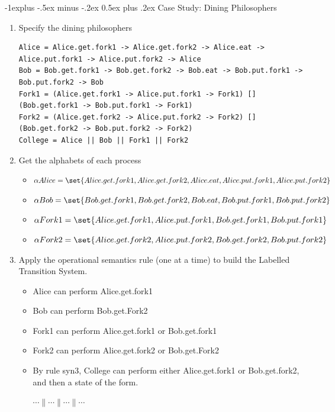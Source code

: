 \documentclass[10pt, landscape]{article}
\makeatletter
\renewcommand{\subsection}{\@startsection{subsection}{2}{0mm}%
  {-1explus -.5ex minus -.2ex}%
  {0.5ex plus .2ex}%
{\normalfont\normalsize\bfseries}}
\makeatother
\begin{document}
\begin{multicols*}{3}
  \subsection{Case Study: Dining Philosophers}
  \begin{enumerate}
      \item Specify the dining philosophers 
\begin{lstlisting}
Alice = Alice.get.fork1 -> Alice.get.fork2 -> Alice.eat -> Alice.put.fork1 -> Alice.put.fork2 -> Alice
Bob = Bob.get.fork1 -> Bob.get.fork2 -> Bob.eat -> Bob.put.fork1 -> Bob.put.fork2 -> Bob
Fork1 = (Alice.get.fork1 -> Alice.put.fork1 -> Fork1) [] (Bob.get.fork1 -> Bob.put.fork1 -> Fork1)
Fork2 = (Alice.get.fork2 -> Alice.put.fork2 -> Fork2) [] (Bob.get.fork2 -> Bob.put.fork2 -> Fork2)
College = Alice || Bob || Fork1 || Fork2
\end{lstlisting}
      \item Get the alphabets of each process
      \begin{itemize}
          \item $\alpha Alice = \set{Alice.get.fork1, Alice.get.fork2, Alice.eat, Alice.put.fork1, Alice.put.fork2}$
          \item $\alpha Bob = \set{Bob.get.fork1, Bob.get.fork2, Bob.eat, Bob.put.fork1, Bob.put.fork2}$
          \item $\alpha Fork1 = \set{Alice.get.fork1, Alice.put.fork1, Bob.get.fork1, Bob.put.fork1}$
          \item $\alpha Fork2 = \set{Alice.get.fork2, Alice.put.fork2, Bob.get.fork2, Bob.put.fork2}$
      \end{itemize}
      \item Apply the operational semantics rule (one at a time) to build the Labelled Transition System.
      \begin{itemize}
          \item Alice can perform Alice.get.fork1
          \item Bob can perform Bob.get.Fork2
          \item Fork1 can perform Alice.get.fork1 or Bob.get.fork1
          \item Fork2 can perform Alice.get.fork2 or Bob.get.Fork2
          \item By rule syn3, College can perform either Alice.get.fork1 or Bob.get.fork2, and then a state of the form.
          \begin{center}
              $\cdots \parallel \cdots \parallel \cdots \parallel \cdots$
          \end{center}

\end{itemize}
\end{enumerate}
\end{multicols*}
\end{document}
